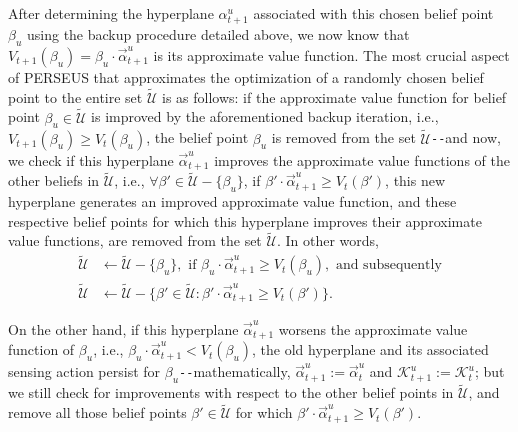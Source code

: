 After determining the hyperplane $\alpha_{t+1}^{u}$ associated with this chosen belief point $\beta_{u}$ using the backup procedure detailed above, we now know that $V_{t+1}(\beta_{u}){=}\beta_{u}{\cdot}\vec{\alpha}_{t+1}^{u}$ is its approximate value function. The most crucial aspect of PERSEUS that approximates the optimization of a randomly chosen belief point to the entire set $\tilde{\mathcal{U}}$ is as follows: if the approximate value function for belief point $\beta_{u}{\in}\tilde{\mathcal{U}}$ is improved by the aforementioned backup iteration, i.e., $V_{t+1}(\beta_{u}){\geq}V_{t}(\beta_{u})$, the belief point $\beta_{u}$ is removed from the set $\tilde{\mathcal{U}}$\texttt{-{}-}and now, we check if this hyperplane $\vec{\alpha}_{t+1}^{u}$ improves the approximate value functions of the other beliefs in $\tilde{\mathcal{U}}$, i.e., ${\forall}\beta'{\in}\tilde{\mathcal{U}}{-}\{\beta_{u}\}$, if $\beta'{\cdot}\vec{\alpha}_{t+1}^{u}{\geq}V_{t}(\beta')$, this new hyperplane generates an improved approximate value function, and these respective belief points for which this hyperplane improves their approximate value functions, are removed from the set $\tilde{\mathcal{U}}$. In other words,
\begin{equation}\label{28}
    \begin{aligned}
        \tilde{\mathcal{U}} &\longleftarrow \tilde{\mathcal{U}}-\{\beta_{u}\},\text{ if }\beta_{u}{\cdot}\vec{\alpha}_{t+1}^{u} \geq V_{t}(\beta_{u}),\text{ and subsequently}\\
        \tilde{\mathcal{U}} &\longleftarrow \tilde{\mathcal{U}}-\{\beta' \in \tilde{\mathcal{U}}:\beta' \cdot \vec{\alpha}_{t+1}^{u} \geq V_{t}(\beta')\}.
    \end{aligned}
\end{equation}

On the other hand, if this hyperplane $\vec{\alpha}_{t+1}^{u}$ worsens the approximate value function of $\beta_{u}$, i.e., $\beta_{u}{\cdot}\vec{\alpha}_{t+1}^{u}{<}V_{t}(\beta_{u})$, the old hyperplane and its associated sensing action persist for $\beta_{u}$\texttt{-{}-}mathematically, $\vec{\alpha}_{t+1}^{u}{:=}\vec{\alpha}_{t}^{u}$ and $\mathcal{K}_{t+1}^{u}{:=}\mathcal{K}_{t}^{u}$; but we still check for improvements with respect to the other belief points in $\tilde{\mathcal{U}}$, and remove all those belief points $\beta'{\in}\tilde{\mathcal{U}}$ for which $\beta'{\cdot}\vec{\alpha}_{t+1}^{u}{\geq}V_{t}(\beta')$. 

